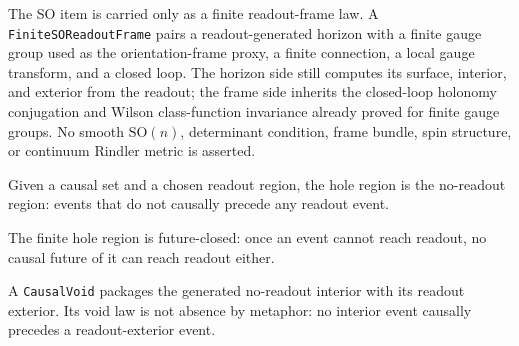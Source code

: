 \begin{theorem}\label{thm:finite-so-readout-frame}\leanok{}
The SO item is carried only as a finite readout-frame law.  A
\texttt{FiniteSOReadoutFrame} pairs a readout-generated horizon with a finite
gauge group used as the orientation-frame proxy, a finite connection, a local
gauge transform, and a closed loop.  The horizon side still computes its
surface, interior, and exterior from the readout; the frame side inherits the
closed-loop holonomy conjugation and Wilson class-function invariance already
proved for finite gauge groups.  No smooth \(\mathrm{SO}(n)\), determinant
condition, frame bundle, spin structure, or continuum Rindler metric is
asserted.
\end{theorem}

\begin{proposition}\label{thm:hole-region}\leanok{}
Given a causal set and a chosen readout region, the hole region is the
no-readout region: events that do not causally precede any readout event.
\end{proposition}

\begin{theorem}\label{thm:hole-future-closed}\leanok{}
The finite hole region is future-closed: once an event cannot reach readout,
no causal future of it can reach readout either.
\end{theorem}

\begin{theorem}\label{thm:causal-void}\leanok{}
A \texttt{CausalVoid} packages the generated no-readout interior with its readout
exterior.  Its void law is not absence by metaphor: no interior event causally
precedes a readout-exterior event.
\end{theorem}

